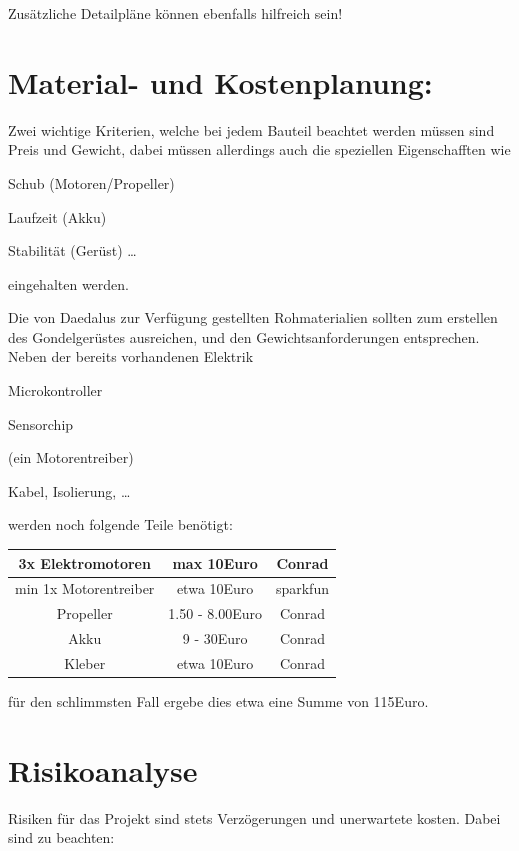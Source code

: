 \documentclass[lang=ngerman,inputenc=utf8,fontsize=10pt]{ldvarticle}
\begin{document}
Zusätzliche Detailpläne können ebenfalls hilfreich sein!

\section{Material- und Kostenplanung:}


Zwei wichtige Kriterien, welche bei jedem Bauteil beachtet werden müssen sind Preis und Gewicht, dabei müssen allerdings auch die speziellen Eigenschafften wie
\begin{list}{-}{}
\item Schub (Motoren/Propeller)
\item Laufzeit (Akku)
\item Stabilität (Gerüst)
…
\end{list}
eingehalten werden.

Die von Daedalus zur Verfügung gestellten Rohmaterialien sollten zum erstellen des Gondelgerüstes ausreichen, und den Gewichtsanforderungen entsprechen. Neben der bereits vorhandenen Elektrik
\begin{list}{-}{}
\item Microkontroller
\item Sensorchip
\item (ein Motorentreiber)
\item Kabel, Isolierung, …
\end{list}
werden noch folgende Teile benötigt:

\begin{tabular}{|c|c|c|}
\hline 
3x Elektromotoren & max 10Euro & Conrad \\ 
\hline 
min 1x Motorentreiber & etwa 10Euro & sparkfun \\ 
\hline 
Propeller & 1.50 - 8.00Euro & Conrad \\ 
\hline 
Akku & 9 - 30Euro & Conrad \\ 
\hline 
Kleber & etwa 10Euro & Conrad \\ 
\hline 
\end{tabular} 

für den schlimmsten Fall ergebe dies etwa eine Summe von 115Euro.




\section{Risikoanalyse}

Risiken für das Projekt sind stets Verzögerungen und unerwartete kosten. Dabei sind zu beachten: 
\end{document}
